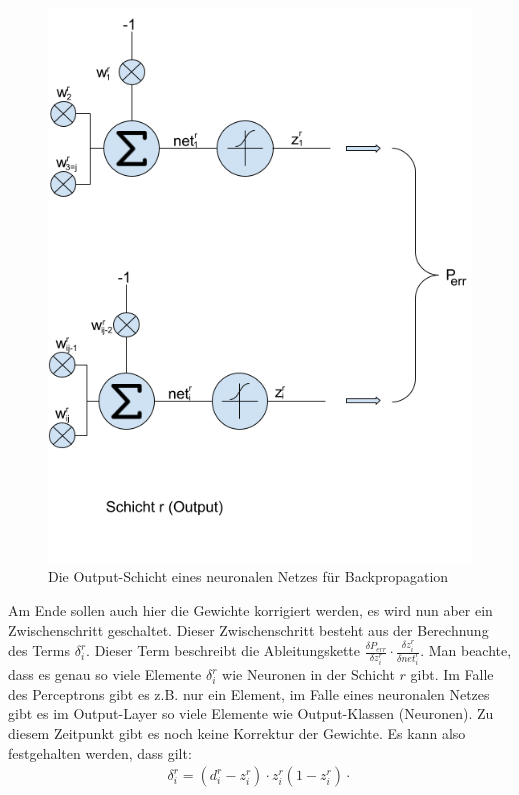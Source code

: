 \begin{figure}[h!]
    \begin{center}
        \includegraphics[width=1\linewidth]{../common/01_neuronal_network/00_resources/04_backpropagation_output.png}
    \end{center}
    \caption{Die Output-Schicht eines neuronalen Netzes für Backpropagation}
    \label{fig:08_backpropagation_output}
\end{figure}
Am Ende sollen auch hier die Gewichte korrigiert werden, es wird nun aber ein Zwischenschritt geschaltet.
Dieser Zwischenschritt besteht aus der Berechnung des Terms $\delta_i^r$. Dieser Term beschreibt die Ableitungskette
$\frac{\delta P_{err}}{\delta z_i^r} \cdot \frac{\delta z_i^r}{\delta net_i^r}$. Man beachte, dass es genau so viele Elemente
$\delta_i^r$ wie Neuronen in der Schicht $r$ gibt.
Im Falle des Perceptrons gibt es z.B. nur ein Element, im Falle eines neuronalen Netzes gibt es im Output-Layer so viele Elemente wie
Output-Klassen (Neuronen). Zu diesem Zeitpunkt gibt es noch keine Korrektur der Gewichte.
Es kann also festgehalten werden, dass gilt:
\begin{align}
    \delta_i^r = (d_i^r - z_i^r) \cdot z_i^r(1 - z_i^r) \cdot \label{eq:04_delta_output}
\end{align}

